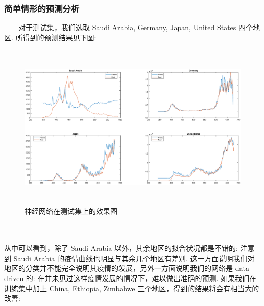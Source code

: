 \documentclass[a4paper, titlepage]{article}
\begin{document}
        \subsubsection{简单情形的预测分析}
	　　对于测试集，我们选取 Saudi Arabia, Germany, Japan, United States 四个地区. 所得到的预测结果见下图:\\
	\begin{minipage}{\textwidth}
        \begin{figure}[H]
            \centering
            \includegraphics[height=8cm, width=14cm]{./Chap4/Pred2.eps}
            \vspace{-1.5em}
            \caption{神经网络在测试集上的效果图}
        \end{figure}
    \end{minipage}\\\quad\\
	从中可以看到，除了 Saudi Arabia 以外，其余地区的拟合状况都是不错的; 注意到 Saudi Arabia 的疫情曲线也明显与其余几个地区有差别. 这一方面说明我们对地区的分类并不能完全说明其疫情的发展，另外一方面说明我们的网络是 data-driven 的: 在并未见过这样疫情发展的情况下，难以做出准确的预测. 如果我们在训练集中加上 China, Ethiopia, Zimbabwe 三个地区，得到的结果将会有相当大的改善:\\
    \vspace{-1em}
\end{document}
